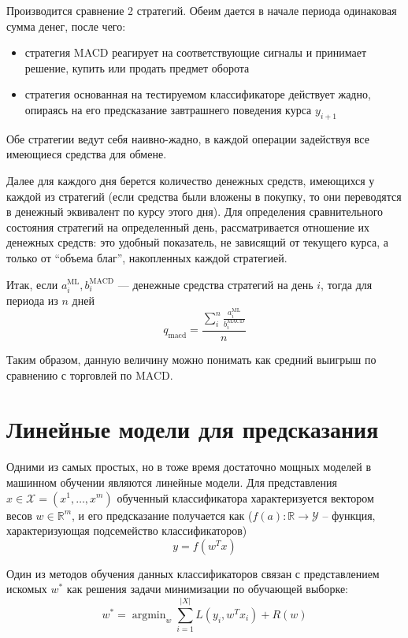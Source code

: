 \documentclass[14pt,a4paper]{extreport}
\DeclareMathOperator*{\argmin}{argmin}
\begin{document}
Производится сравнение 2 стратегий. Обеим дается в начале периода одинаковая сумма денег, после чего:
\begin{itemize}
\item стратегия MACD реагирует на соответствующие сигналы и принимает решение, купить или продать предмет оборота
\item стратегия основанная на тестируемом классификаторе действует жадно, опираясь на его предсказание завтрашнего
поведения курса $y_{i+1}$
\end{itemize}
Обе стратегии ведут себя наивно-жадно, в каждой операции задействуя все имеющиеся средства для обмене.

Далее для каждого дня берется количество денежных средств, имеющихся у каждой из стратегий (если средства были
вложены в покупку, то они переводятся в денежный эквивалент по курсу этого дня). Для определения сравнительного состояния
стратегий на определенный день, рассматривается отношение их денежных средств: это удобный показатель, не зависящий
от текущего курса, а только от ``объема благ'', накопленных каждой стратегией.

Итак, если $a^{\text{ML}}_i, b^{\text{MACD}}_i$ --- денежные средства стратегий на день $i$, тогда для периода из $n$ дней
\begin{equation}
q_\text{macd} = \frac{\sum_i^n \frac{a^{\text{ML}}_i}{b^{\text{MACD}}_i}}{n}
\end{equation}

Таким образом, данную величину можно понимать как средний выигрыш по сравнению с торговлей по MACD.

\section{Линейные модели для предсказания}

Одними из самых простых, но в тоже время достаточно мощных моделей в машинном обучении являются линейные модели\cite{linear_cls}.
Для представления $x\in\mathcal{X}=(x^1,\ldots,x^m)$ обученный классификатора характеризуется вектором весов $w\in\mathbb{R}^m$,
и его предсказание получается как ($f(a) : \mathbb{R}\to\mathcal{Y}$ -- функция,
характеризующая подсемейство классификаторов)
\begin{equation}
y=f(w^Tx)
\end{equation}

Один из методов обучения данных классификаторов связан с представлением искомых $w^*$ как решения задачи минимизации
по обучающей выборке:
\begin{equation}
w^*=\argmin_w \sum_{i=1}^{|X|} L(y_i,w^Tx_i) + R(w)
\end{equation}
\end{document}
